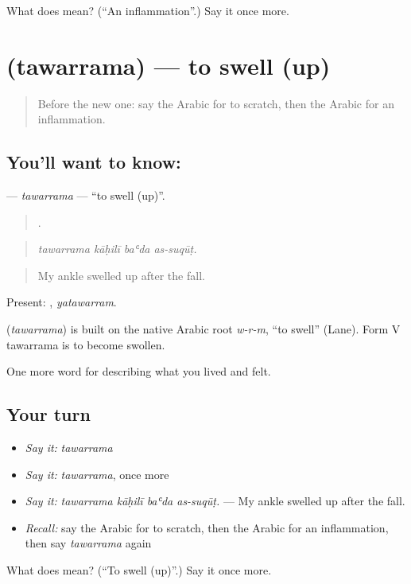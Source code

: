 \begin{tcolorbox}[breakable,colback=teal!4,colframe=teal!35!black,title={Before you move on}]
What does  mean? (\textquotedblleft{}An inflammation\textquotedblright{}.) Say it once more.
\end{tcolorbox}
\section[\texorpdfstring{\ar{تورم} (tawarrama)}{تورم (tawarrama)}]{ (tawarrama) — to swell (up)}

\label{lesson:AR-C508-tawarrama}



\begin{quote}
Before the new one: say the Arabic for to scratch, then the Arabic for an inflammation.
\end{quote}

\subsection*{You'll want to know: }
\textbf{} — \emph{tawarrama} — \textquotedblleft{}to swell (up)\textquotedblright{}.

\begin{quote}
   .
\end{quote}

\begin{quote}
\emph{tawarrama kāḥilī baʿda as-suqūṭ.}
\end{quote}

\begin{quote}
My ankle swelled up after the fall.
\end{quote}

Present: , \emph{yatawarram}.

\begin{cousinweb}
\textbf{} (\emph{tawarrama}) is built on the native Arabic root \emph{w-r-m}, \textquotedblleft{}to swell\textquotedblright{} (Lane). Form V tawarrama is to become swollen.
\end{cousinweb}

\begin{grammarlens}[title={What you've built}]
One more word for describing what you lived and felt.
\end{grammarlens}

\subsection*{Your turn}
\begin{itemize}
\raggedright
  \item \emph{Say it:} \emph{tawarrama}
  \item \emph{Say it:} \emph{tawarrama}, once more
  \item \emph{Say it:} \emph{tawarrama kāḥilī baʿda as-suqūṭ.} — My ankle swelled up after the fall.
  \item \emph{Recall:} say the Arabic for to scratch, then the Arabic for an inflammation, then say \emph{tawarrama} again
\end{itemize}

\begin{tcolorbox}[breakable,colback=teal!4,colframe=teal!35!black,title={Before you move on}]
What does  mean? (\textquotedblleft{}To swell (up)\textquotedblright{}.) Say it once more.
\end{tcolorbox}
